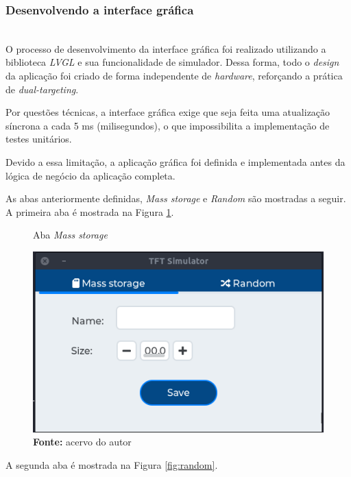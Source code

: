 \documentclass[times, twoside, watermark]{artigo}
\begin{document}
\subsubsection{Desenvolvendo a interface gráfica}\hfill\\

O processo de desenvolvimento da interface gráfica foi realizado utilizando a 
biblioteca \textit{LVGL} e sua funcionalidade de simulador. Dessa forma, todo o 
\textit{design} da aplicação foi criado de forma independente de \textit{hardware},
reforçando a prática de \textit{dual-targeting}.

Por questões técnicas, a interface gráfica exige que seja feita uma atualização
síncrona a cada 5 ms (milisegundos), o que impossibilita a implementação de testes 
unitários.

Devido a essa limitação, a aplicação gráfica foi definida e implementada antes da 
lógica de negócio da aplicação completa.

As abas anteriormente definidas, \textit{Mass storage} e \textit{Random} são 
mostradas a seguir. A primeira aba é mostrada na Figura 
\ref{fig:mass-storage}.\hfill\

\begin{figure}[H]
  \centering
  \caption{Aba \textit{Mass storage}}
  \includegraphics[width=0.95\linewidth]{images/mass-storage-screen.png}
  \caption*{\newline\textbf{Fonte:} acervo do autor}
  \label{fig:mass-storage}
\end{figure}

A segunda aba é mostrada na Figura \ref{fig:random}.\hfill\
\end{document}
